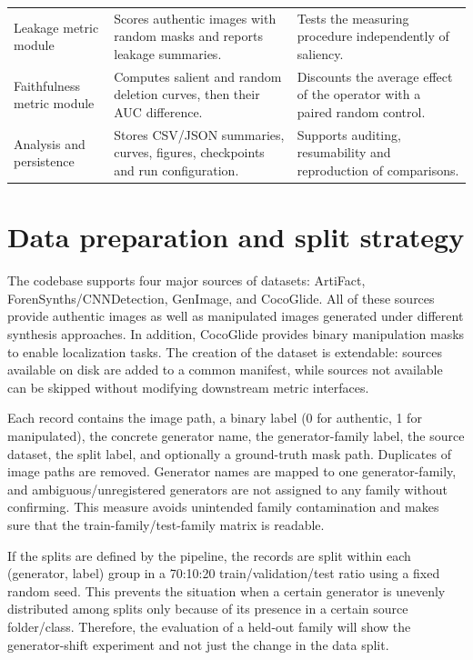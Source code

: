 \begin{table}[H]
\begin{tabular}{@{}>{\raggedright\arraybackslash}p{}>{\raggedright\arraybackslash}p{}>{\raggedright\arraybackslash}p{}@{}}
        \addlinespace
        Leakage metric module & Scores authentic images with random masks and reports leakage summaries. & Tests the measuring procedure independently of saliency. \\
        \addlinespace
        Faithfulness metric module & Computes salient and random deletion curves, then their AUC difference. & Discounts the average effect of the operator with a paired random control. \\
        \addlinespace
        Analysis and persistence & Stores CSV/JSON summaries, curves, figures, checkpoints and run configuration. & Supports auditing, resumability and reproduction of comparisons. \\
        \bottomrule
    \end{tabular}
\end{table}

\section{\texorpdfstring{\textbf{Data preparation and split
strategy}}{Data preparation and split strategy}}\label{data-preparation-and-split-strategy}

The codebase supports four major sources of datasets: ArtiFact,
ForenSynths/CNNDetection, GenImage, and CocoGlide. All of these sources
provide authentic images as well as manipulated images generated under
different synthesis approaches. In addition, CocoGlide provides binary
manipulation masks to enable localization tasks. The creation of the
dataset is extendable: sources available on disk are added to a common
manifest, while sources not available can be skipped without modifying
downstream metric interfaces.

Each record contains the image path, a binary label (0 for authentic, 1
for manipulated), the concrete generator name, the generator-family
label, the source dataset, the split label, and optionally a
ground-truth mask path. Duplicates of image paths are removed. Generator
names are mapped to one generator-family, and ambiguous/unregistered
generators are not assigned to any family without confirming. This
measure avoids unintended family contamination and makes sure that the
train-family/test-family matrix is readable.

If the splits are defined by the pipeline, the records are split within
each (generator, label) group in a 70:10:20 train/validation/test ratio
using a fixed random seed. This prevents the situation when a certain
generator is unevenly distributed among splits only because of its
presence in a certain source folder/class. Therefore, the evaluation of
a held-out family will show the generator-shift experiment and not just
the change in the data split.

